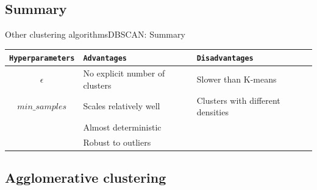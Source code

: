 \documentclass[10pt,compress]{beamer} %
\begin{document}


\subsection{Summary}
\begin{frame}{Other clustering algorithms}{DBSCAN: Summary}
	\begin{center}
	\begin{tabular}{cll}\hline
	 	\texttt{Hyperparameters}  & \texttt{Advantages}     & \texttt{Disadvantages} \\\hline
	 	$\epsilon$                & No explicit number of clusters  & Slower than K-means \\
	    $min\_samples$	          & Scales relatively well  & Clusters with different densities \\
	                 	          & Almost deterministic    &  \\
	                 	          & Robust to outliers      &  \\
	 	\hline
	\end{tabular}
	\end{center}
\end{frame}

\subsection{Agglomerative clustering}
\end{document}
